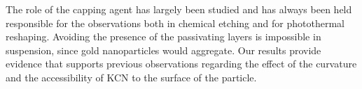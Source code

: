 The role of the capping agent has largely been studied and has always been
held responsible for the observations both in chemical etching\cite{Yuan2015}
and for photothermal reshaping\cite{Horiguchi2008}. Avoiding the presence of
the passivating layers is impossible in suspension, since gold nanoparticles
would aggregate. Our results provide evidence that supports previous
observations regarding the effect of the curvature and the accessibility of
KCN to the surface of the particle.

